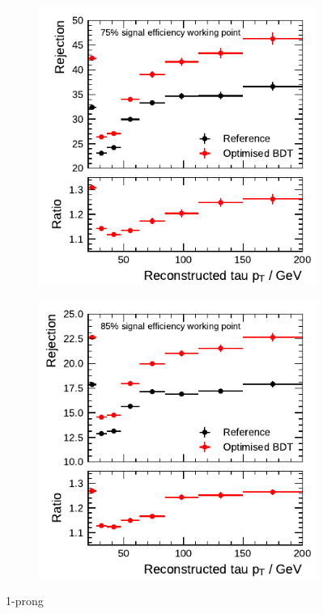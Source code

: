 \begin{figure}[htb]
  \centering
  \begin{subfigure}{0.48\textwidth}
    \centering
    \includegraphics{./figures/bdt_perf/post_optimisation/rejection_medium_1p.pdf}
  \end{subfigure}\hfill
  \begin{subfigure}{0.48\textwidth}
    \centering
    \includegraphics{./figures/bdt_perf/post_optimisation/rejection_loose_1p.pdf}
  \end{subfigure}
  \caption{1-prong}
\end{figure}

